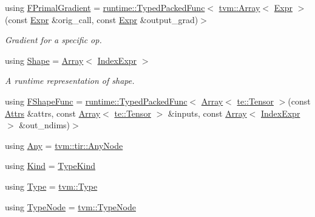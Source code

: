 \begin{DoxyCompactItemize}
using \hyperlink{namespacetvm_1_1relay_a9abada45a4f21ae750c1caba923f1059}{F\+Primal\+Gradient} = \hyperlink{classtvm_1_1runtime_1_1TypedPackedFunc}{runtime\+::\+Typed\+Packed\+Func}$<$ \hyperlink{classtvm_1_1Array}{tvm\+::\+Array}$<$ \hyperlink{namespacetvm_1_1relay_a5b84e3790f89bb3fad5c7911eeb99531}{Expr} $>$(const \hyperlink{namespacetvm_1_1relay_a5b84e3790f89bb3fad5c7911eeb99531}{Expr} \&orig\+\_\+call, const \hyperlink{namespacetvm_1_1relay_a5b84e3790f89bb3fad5c7911eeb99531}{Expr} \&output\+\_\+grad)$>$
\begin{DoxyCompactList}\small\item\em Gradient for a specific op. \end{DoxyCompactList}\item 
using \hyperlink{namespacetvm_1_1relay_a4d64348ae2b75977e167109fb4af4409}{Shape} = \hyperlink{classtvm_1_1Array}{Array}$<$ \hyperlink{namespacetvm_1_1relay_ae153a27d81399fd266b8d598227764c4}{Index\+Expr} $>$
\begin{DoxyCompactList}\small\item\em A runtime representation of shape. \end{DoxyCompactList}\item 
using \hyperlink{namespacetvm_1_1relay_a6f7012819c4abe61de2d52e4bf94cfbd}{F\+Shape\+Func} = \hyperlink{classtvm_1_1runtime_1_1TypedPackedFunc}{runtime\+::\+Typed\+Packed\+Func}$<$ \hyperlink{classtvm_1_1Array}{Array}$<$ \hyperlink{classtvm_1_1te_1_1Tensor}{te\+::\+Tensor} $>$(const \hyperlink{classtvm_1_1Attrs}{Attrs} \&attrs, const \hyperlink{classtvm_1_1Array}{Array}$<$ \hyperlink{classtvm_1_1te_1_1Tensor}{te\+::\+Tensor} $>$ \&inputs, const \hyperlink{classtvm_1_1Array}{Array}$<$ \hyperlink{namespacetvm_1_1relay_ae153a27d81399fd266b8d598227764c4}{Index\+Expr} $>$ \&out\+\_\+ndims)$>$
\item 
using \hyperlink{namespacetvm_1_1relay_aa6b4b16b28a3cfd5052b2b4214a440d9}{Any} = \hyperlink{classtvm_1_1tir_1_1AnyNode}{tvm\+::tir\+::\+Any\+Node}
\item 
using \hyperlink{namespacetvm_1_1relay_aa44e35e7d791c8dd53bb00ddb6411b38}{Kind} = \hyperlink{namespacetvm_acd267f8d7f55da6ac681239831963279}{Type\+Kind}
\item 
using \hyperlink{namespacetvm_1_1relay_a661d95f170bca230773914caeef3fe52}{Type} = \hyperlink{classtvm_1_1Type}{tvm\+::\+Type}
\item 
using \hyperlink{namespacetvm_1_1relay_af6995f0c848d0d5cc4124a38f43aaf12}{Type\+Node} = \hyperlink{classtvm_1_1TypeNode}{tvm\+::\+Type\+Node}
\item 

\end{DoxyCompactItemize}
